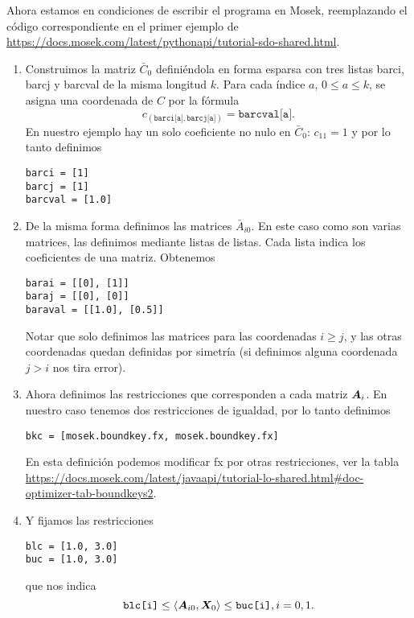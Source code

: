 \documentclass[11pt]{article}
\begin{document}
Ahora estamos en condiciones de escribir el programa en Mosek, reemplazando el código correspondiente en el primer ejemplo de \url{https://docs.mosek.com/latest/pythonapi/tutorial-sdo-shared.html}.

\begin{enumerate}
\item Construimos la matriz $\bar C_0$ definiéndola en forma esparsa con tres listas barci, barcj y barcval de la misma longitud $k$. Para cada índice $a$, $0 \le a \le k$, se asigna una coordenada de $C$ por la fórmula
    $$c_{(\texttt{barci[a]}, \texttt{barcj[a]})} = \texttt{barcval[a]}.$$
    En nuestro ejemplo hay un solo coeficiente no nulo en $\bar C_0$: $c_{11} = 1$ y por lo tanto definimos
\begin{lstlisting}
barci = [1]
barcj = [1]
barcval = [1.0]
\end{lstlisting}

\item De la misma forma definimos las matrices $\bar A_{i0}$. En este caso como son varias matrices, las definimos mediante listas de listas. Cada lista indica los coeficientes de una matriz. Obtenemos
\begin{lstlisting}
barai = [[0], [1]]
baraj = [[0], [0]]
baraval = [[1.0], [0.5]]
\end{lstlisting}

Notar que solo definimos las matrices para las coordenadas $i \ge j$, y las otras coordenadas quedan definidas por simetr\'ia (si definimos alguna coordenada $j > i$ nos tira error).

\item Ahora definimos las restricciones que corresponden a cada matriz $\bm{A}_i$. En nuestro caso tenemos dos restricciones de igualdad, por lo tanto definimos
\begin{lstlisting}
bkc = [mosek.boundkey.fx, mosek.boundkey.fx]
\end{lstlisting}

En esta definici\'on podemos modificar fx por otras restricciones, ver la tabla
\url{https://docs.mosek.com/latest/javaapi/tutorial-lo-shared.html#doc-optimizer-tab-boundkeys2}.

\item Y fijamos las restricciones
\begin{lstlisting}
blc = [1.0, 3.0]
buc = [1.0, 3.0]
\end{lstlisting}
que nos indica
$$\texttt{blc[i]} \le \langle \bm{A}_{i0}, \bm{X}_{0} \rangle \le \texttt{buc[i]}, i = 0,1.$$


\end{enumerate}
\end{document}
